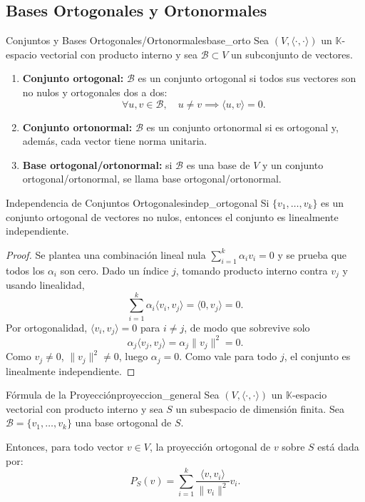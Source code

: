 \documentclass[11pt, a4paper]{article}
\begin{document}
\subsection{Bases Ortogonales y Ortonormales}

\begin{definicion}{Conjuntos y Bases Ortogonales/Ortonormales}{base_orto}
Sea $(V, \langle \cdot, \cdot \rangle)$ un $\mathbb{K}$-espacio vectorial con producto interno y sea $\mathcal{B} \subset V$ un subconjunto de vectores.

\begin{enumerate}
    \item \textbf{Conjunto ortogonal:} $\mathcal{B}$ es un conjunto ortogonal si todos sus vectores son no nulos y ortogonales dos a dos:
    \[
    \forall u, v \in \mathcal{B}, \quad u \neq v \implies \langle u, v \rangle = 0.
    \]

    \item \textbf{Conjunto ortonormal:} $\mathcal{B}$ es un conjunto ortonormal si es ortogonal y, además, cada vector tiene norma unitaria.

    \item \textbf{Base ortogonal/ortonormal:} si $\mathcal{B}$ es una base de $V$ y un conjunto ortogonal/ortonormal, se llama base ortogonal/ortonormal.
\end{enumerate}
\end{definicion}

\begin{proposicion}{Independencia de Conjuntos Ortogonales}{indep_ortogonal}
Si $\{v_1, \dots, v_k\}$ es un conjunto ortogonal de vectores no nulos, entonces el conjunto es linealmente independiente.
\end{proposicion}

\begin{proof}
Se plantea una combinación lineal nula $\sum_{i=1}^{k} \alpha_i v_i = 0$ y se prueba que todos los $\alpha_i$ son cero. Dado un índice $j$, tomando producto interno contra $v_j$ y usando linealidad,
\[
\sum_{i=1}^{k} \alpha_i \langle v_i, v_j \rangle = \langle 0, v_j \rangle = 0.
\]
Por ortogonalidad, $\langle v_i, v_j \rangle = 0$ para $i \neq j$, de modo que sobrevive solo
\[
\alpha_j \langle v_j, v_j \rangle = \alpha_j \|v_j\|^2 = 0.
\]
Como $v_j \neq 0$, $\|v_j\|^2 \neq 0$, luego $\alpha_j = 0$. Como vale para todo $j$, el conjunto es linealmente independiente.
\end{proof}

\begin{teorema}{Fórmula de la Proyección}{proyeccion_general}
Sea $(V, \langle \cdot, \cdot \rangle)$ un $\mathbb{K}$-espacio vectorial con producto interno y sea $S$ un subespacio de dimensión finita.
Sea $\mathcal{B} = \{v_1, \dots, v_k\}$ una base ortogonal de $S$.

Entonces, para todo vector $v \in V$, la proyección ortogonal de $v$ sobre $S$ está dada por:
\[
P_S(v) = \sum_{i=1}^{k} \frac{\langle v, v_i \rangle}{\|v_i\|^2} v_i.
\]
\end{teorema}
\end{document}
